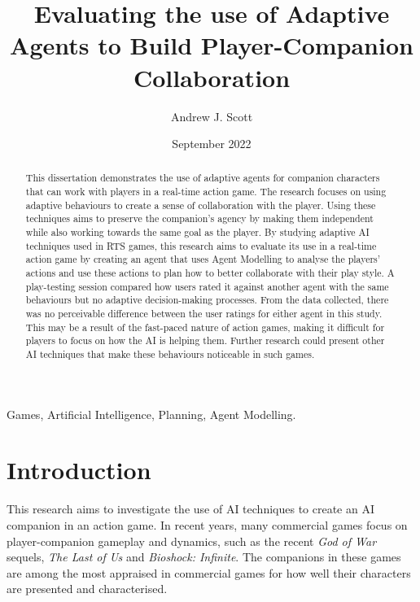 \documentclass{IEEEtran}
\title{Evaluating the use of Adaptive Agents to Build Player-Companion Collaboration}
\author{Andrew J. Scott}
\date{September 2022}
\begin{document}
	\maketitle

\begin{abstract}
This dissertation demonstrates the use of adaptive agents for companion characters that can work with players in a real-time action game. The research focuses on using adaptive behaviours to create a sense of collaboration with the player. Using these techniques aims to preserve the companion’s agency by making them independent while also working towards the same goal as the player. By studying adaptive AI techniques used in RTS games, this research aims to evaluate its use in a real-time action game by creating an agent that uses Agent Modelling to analyse the players’ actions and use these actions to plan how to better collaborate with their play style. A play-testing session compared how users rated it against another agent with the same behaviours but no adaptive decision-making processes. From the data collected, there was no perceivable difference between the user ratings for either agent in this study. This may be a result of the fast-paced nature of action games, making it difficult for players to focus on how the AI is helping them. Further research could present other AI techniques that make these behaviours noticeable in such games.
\end{abstract}

 \begin{IEEEkeywords}
Games, Artificial Intelligence, Planning, Agent Modelling.
\end{IEEEkeywords}

\section{Introduction}
\label{Intro}


This research aims to investigate the use of AI techniques to create an AI companion in an action game. In recent years, many commercial games focus on player-companion gameplay and dynamics, such as the recent \textit{God of War} sequels, \textit{The Last of Us} and \textit{Bioshock: Infinite}. The companions in these games are among the most appraised in commercial games for how well their characters are presented and characterised.

\end{document}
